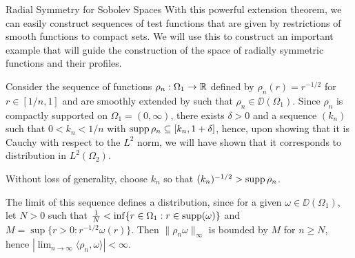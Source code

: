 \begin{chapter}{Radial Symmetry for Sobolev Spaces}
With this powerful extension theorem, we can easily construct sequences of test functions that are given by restrictions of smooth functions to compact sets.
We will use this to construct an important example that will guide the construction of the space of radially symmetric functions and their profiles.

Consider the sequence of functions $\rho_n:\Omega_1 \to \mathbb R$ defined by $\rho_n(r) = r^{-1/2}$ for $r\in [1/n,1]$ and are smoothly extended  by  such that $\rho_n \in \DD(\Omega_1)$.
Since $\rho_n$ is compactly supported on $\Omega_1 = (0,\infty)$, there exists $\delta>0$ and a sequence $(k_n)$ such that $0<k_n<1/n$ with $\operatorname*{supp} \rho_n \subseteq \left[k_n,1+\delta\right]$, hence, upon showing that it is Cauchy with respect to the $L^2$ norm, we will have shown that it corresponds to distribution in $L^2(\Omega_2)$.
\begin{com}
Without loss of generality, choose $k_n$ so that $(k_n)^{-1/2} > \operatorname*{supp} \rho_n$.
\end{com}
The limit of this sequence defines a distribution, since for a given $\omega \in \DD(\Omega_1)$, let $N>0$ such that $\frac 1N < \inf \{r\in\Omega_1: r \in \operatorname*{supp} (\omega)\}$ and $M = \sup \{r>0:r^{-1/2}\omega(r)\}$. 
Then $\|\rho_n \omega \|_{\infty}$ is bounded by $M$ for $n\ge N$, hence $\displaystyle{\left|\lim_{n\to\infty} \langle \rho_n,\omega\rangle\right| < \infty}$.


\end{chapter}
